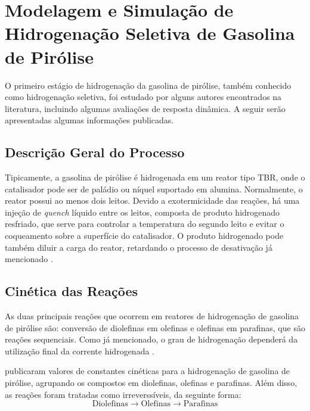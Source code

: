 \section {Modelagem e Simulação de Hidrogenação Seletiva de Gasolina de Pirólise}
\label{sec:hidrogenacaopygas}

O primeiro estágio de hidrogenação da gasolina de pirólise, também conhecido
como hidrogenação seletiva, foi estudado por alguns autores encontrados na
literatura, incluindo algumas avaliações de resposta dinâmica. A seguir serão
apresentadas algumas informações publicadas.

\subsection{Descrição Geral do Processo} \label{sec:descricaogeral}

Tipicamente, a gasolina de pirólise é hidrogenada em um reator tipo TBR, onde o
catalisador pode ser de paládio ou níquel suportado em alumina. Normalmente, o
reator possui ao menos dois leitos. Devido a exotermicidade das reações, há uma
injeção de \emph{quench} líquido entre os leitos, composta de produto
hidrogenado resfriado, que serve para controlar a temperatura do segundo leito e
evitar o coqueamento sobre a superfície do catalisador. O produto hidrogenado
pode também diluir a carga do reator, retardando o processo de desativação já
mencionado \cite{Cheng1986,Derrien1986,Arpornwichanop2002,Rojas2014a}.

\subsection{Cinética das Reações} \label{sec:cinetica}

As duas principais reações que ocorrem em reatores de hidrogenação de gasolina
de pirólise são: conversão de diolefinas em olefinas e olefinas em parafinas,
que são reações sequenciais. Como já mencionado, o grau de
hidrogenação dependerá da utilização final da corrente hidrogenada \cite{Cheng1986}.

 publicaram valores de constantes cinéticas para a
hidrogenação de gasolina de pirólise, agrupando os compostos em diolefinas,
olefinas e parafinas. Além disso, as reações foram tratadas como irreverssíveis,
da seguinte forma:
\begin{equation}
\textrm{Diolefinas} \rightarrow \textrm{Olefinas} \rightarrow \textrm{Parafinas}
\label{eq:hidrogenacao}
\end{equation}

